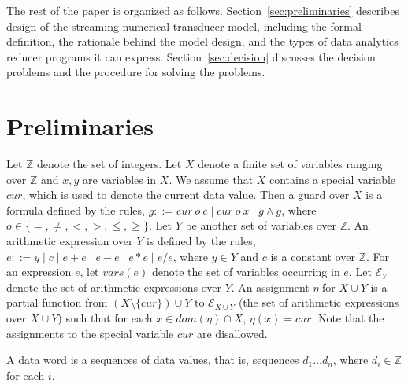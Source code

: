 \documentclass[runningheads,a4paper]{llncs}
\def\Ee{{\mathcal{E} }}
\def\Ii{{\mathbb{Z} }}
\newcommand{\hide}[1]{}
\begin{document}
The rest of the paper is organized as follows. Section~\ref{sec:preliminaries} describes design of the streaming numerical transducer model, including the formal definition, the rationale behind the model design, and the types of data analytics reducer programs it can express. Section~\ref{sec:decision} discusses the decision problems and the procedure for solving the problems.

\hide{
\begin{figure}
	
	\caption{A Simple Programming Language for Reducers}
\end{figure}}

\section{Preliminaries}

Let $\Ii$ denote the set of integers. Let $X$ denote a finite set of variables ranging over $\Ii$ and $x,y$ are variables in $X$. We assume that $X$ contains a special variable $cur$, which is used to denote the current data value. Then a guard over $X$ is a formula defined by the rules, $g::= cur\ o\ c \mid cur\ o\ x \mid g \wedge g$, where $o \in \{=,\neq,<, >, \le, \ge\}$. Let $Y$ be another set of variables over $\Ii$. An arithmetic expression over $Y$ is defined by the rules, $e::= y \mid c \mid e + e \mid e-e \mid e * e \mid e / e$, where $y \in Y$ and $c$ is a constant over $\Ii$. For an expression $e$, let $vars(e)$ denote the set of variables occurring in $e$. Let $\Ee_Y$ denote the set of arithmetic expressions over $Y$. An assignment $\eta$ for $X \cup Y$ is a partial function from $(X \setminus \{cur\}) \cup Y$ to $\Ee_{X \cup Y}$ (the set of arithmetic expressions over $X \cup Y$) such that for each $x \in dom(\eta) \cap X$, $\eta(x)=cur$. Note that the assignments to the special variable $cur$ are disallowed.

A data word is a sequences of data values, that is, sequences $d_1\dots d_n$, where $d_i \in \Ii$ for each $i$.
\end{document}
